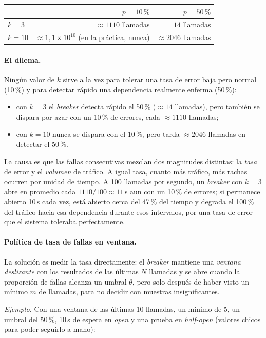 \documentclass[variant=apuntes,cover=institutional,mode=screen]{ua-engineering-v6-article}
\begin{document}
\begin{center}
\begin{tabular}{lrr}
\toprule
 & $p = 10\,\%$ & $p = 50\,\%$ \\
\midrule
$k = 3$  & $\approx 1110$ llamadas & $14$ llamadas \\
$k = 10$ & $\approx 1{,}1\times 10^{10}$ (en la práctica, nunca) & $\approx 2046$ llamadas \\
\bottomrule
\end{tabular}
\end{center}

\paragraph{El dilema.} Ningún valor de $k$ sirve a la vez para tolerar una tasa de error baja pero normal (10\,\%) y para detectar rápido una dependencia realmente enferma (50\,\%):
\begin{itemize}
\item con $k = 3$ el \emph{breaker} detecta rápido el 50\,\% ($\approx 14$ llamadas), pero también se dispara por azar con un 10\,\% de errores, cada $\approx 1110$ llamadas;
\item con $k = 10$ nunca se dispara con el 10\,\%, pero tarda $\approx 2046$ llamadas en detectar el 50\,\%.
\end{itemize}
La causa es que las fallas consecutivas mezclan dos magnitudes distintas: la \emph{tasa} de error y el \emph{volumen} de tráfico. A igual tasa, cuanto más tráfico, más rachas ocurren por unidad de tiempo. A 100 llamadas por segundo, un \emph{breaker} con $k = 3$ abre en promedio cada $1110/100 \approx 11$\,s aun con un 10\,\% de errores; si permanece abierto 10\,s cada vez, está abierto cerca del 47\,\% del tiempo y degrada el 100\,\% del tráfico hacia esa dependencia durante esos intervalos, por una tasa de error que el sistema toleraba perfectamente.

\paragraph{Política de tasa de fallas en ventana.} La solución es medir la tasa directamente: el \emph{breaker} mantiene una \emph{ventana deslizante} con los resultados de las últimas $N$ llamadas y se abre cuando la proporción de fallas alcanza un umbral $\theta$, pero solo después de haber visto un mínimo $m$ de llamadas, para no decidir con muestras insignificantes.

\emph{Ejemplo.} Con una ventana de las últimas 10 llamadas, un mínimo de 5, un umbral del 50\,\%, 10\,s de espera en \emph{open} y una prueba en \emph{half-open} (valores chicos para poder seguirlo a mano):
\end{document}
